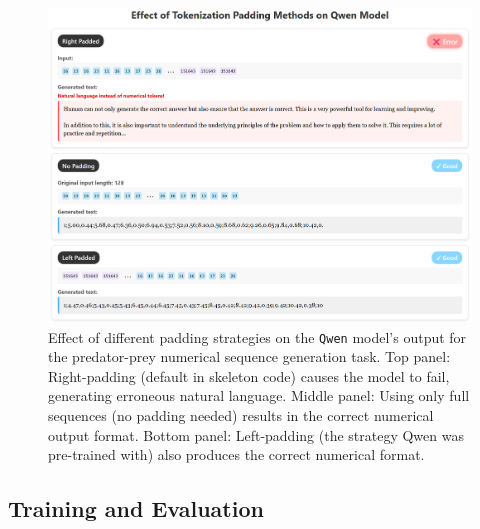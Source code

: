 \documentclass{article}
\begin{document}


\begin{figure}[!htbp] %
    \centering
    \includegraphics[width=0.9\linewidth]{M2 Course Work//Images/padding_effect.png} %
    \caption{Effect of different padding strategies on the \texttt{Qwen} model's output for the predator-prey numerical sequence generation task. Top panel: Right-padding (default in skeleton code) causes the model to fail, generating erroneous natural language. Middle panel: Using only full sequences (no padding needed) results in the correct numerical output format. Bottom panel: Left-padding (the strategy Qwen was pre-trained with) also produces the correct numerical format.}
    \label{fig:padding_effect}
\end{figure}

\subsection{Training and Evaluation}
\end{document}

